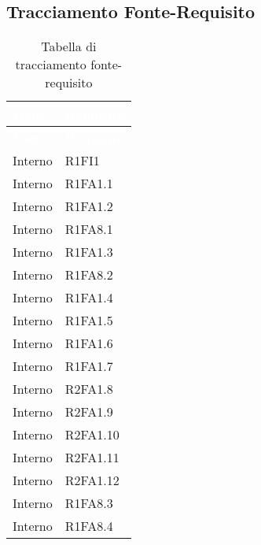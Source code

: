 \subsection{Tracciamento Fonte-Requisito}
{
\renewcommand{\arraystretch}{1.5}
\centering
\begin{longtable}{ C{4cm} C{4cm}}
\caption{Tabella di tracciamento fonte-requisito}\\
\textcolor{white}{\textbf{Fonte}} & \textcolor{white}{\textbf{Requisito}}\\	
\endfirsthead
{}
\textcolor{white}{\textbf{Fonte}} & \textcolor{white}{\textbf{Requisito}}\\
\endhead


Interno & R1FI1\\

Interno & R1FA1.1\\

Interno & R1FA1.2\\

Interno & R1FA8.1\\

Interno & R1FA1.3\\

Interno & R1FA8.2\\

Interno & R1FA1.4\\

Interno & R1FA1.5\\

Interno & R1FA1.6\\

Interno & R1FA1.7\\


Interno & R2FA1.8\\

Interno & R2FA1.9\\

Interno & R2FA1.10\\

Interno & R2FA1.11\\

Interno & R2FA1.12\\

Interno & R1FA8.3\\

Interno & R1FA8.4\\


\end{longtable}}
